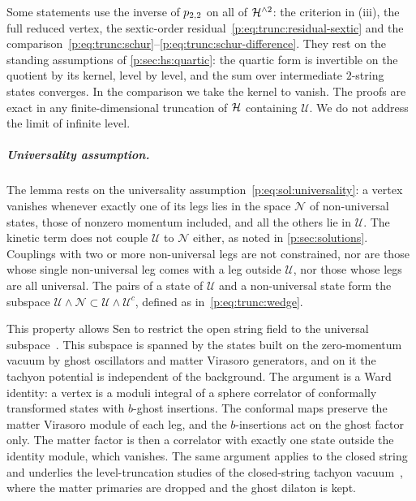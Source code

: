 Some statements use the inverse of $p_{2,2}$ on all of $\mathcal{H}^{\wedge 2}$: the criterion in (iii), the full reduced vertex, the sextic-order residual~\eqref{p:eq:trunc:residual-sextic} and the comparison~\eqref{p:eq:trunc:schur}--\eqref{p:eq:trunc:schur-difference}.
They rest on the standing assumptions of \cref{p:sec:hs:quartic}: the quartic form is invertible on the quotient by its kernel, level by level, and the sum over intermediate $2$-string states converges.
In the comparison we take the kernel to vanish.
The proofs are exact in any finite-dimensional truncation of $\mathcal{H}$ containing $\mathcal U$.
We do not address the limit of infinite level.

\subparagraph{Universality assumption.}

The lemma rests on the universality assumption~\eqref{p:eq:sol:universality}: a vertex vanishes whenever exactly one of its legs lies in the space $\mathcal N$ of non-universal states, those of nonzero momentum included, and all the others lie in $\mathcal U$.
The kinetic term does not couple $\mathcal U$ to $\mathcal N$ either, as noted in \cref{p:sec:solutions}.
Couplings with two or more non-universal legs are not constrained, nor are those whose single non-universal leg comes with a leg outside $\mathcal U$, nor those whose legs are all universal.
The pairs of a state of $\mathcal U$ and a non-universal state form the subspace $\mathcal U \wedge \mathcal N \subset \mathcal U \wedge \mathcal U^c$, defined as in~\eqref{p:eq:trunc:wedge}.

This property allows Sen to restrict the open string field to the universal subspace~\cite{Sen:1999:UniversalityTachyonPotential}.
This subspace is spanned by the states built on the zero-momentum vacuum by ghost oscillators and matter Virasoro generators, and on it the tachyon potential is independent of the background.
The argument is a Ward identity: a vertex is a moduli integral of a sphere correlator of conformally transformed states with $b$-ghost insertions.
The conformal maps preserve the matter Virasoro module of each leg, and the $b$-insertions act on the ghost factor only.
The matter factor is then a correlator with exactly one state outside the identity module, which vanishes.
The same argument applies to the closed string and underlies the level-truncation studies of the closed-string tachyon vacuum~\cite{Yang:2005:ClosedStringTachyon}, where the matter primaries are dropped and the ghost dilaton is kept.

